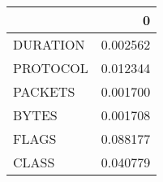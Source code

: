 \begin{tabular}{lr}
\toprule
{} &         0 \\
\midrule
DURATION &  0.002562 \\
PROTOCOL &  0.012344 \\
PACKETS  &  0.001700 \\
BYTES    &  0.001708 \\
FLAGS    &  0.088177 \\
CLASS    &  0.040779 \\
\bottomrule
\end{tabular}
